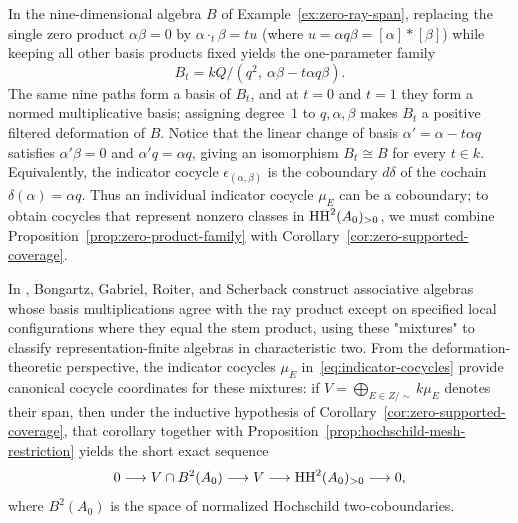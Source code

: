 \begin{example}
\label{ex:zero-product-fibre}
In the nine-dimensional algebra $B$ of Example~\ref{ex:zero-ray-span}, replacing the single zero product $\alpha\beta=0$ by $\alpha\mathbin{\cdot_t}\beta=tu$ (where $u=\alpha q\beta=[\alpha]*[\beta]$) while keeping all other basis products fixed yields the one-parameter family
\[
  B_t=kQ/(q^2,\ \alpha\beta-t\alpha q\beta).
\]
The same nine paths form a basis of $B_t$, and at $t=0$ and $t=1$ they form a normed multiplicative basis; assigning degree~$1$ to $q,\alpha,\beta$ makes $B_t$ a positive filtered deformation of $B$. Notice that the linear change of basis $\alpha'=\alpha-t\alpha q$ satisfies $\alpha'\beta=0$ and $\alpha'q=\alpha q$, giving an isomorphism $B_t\cong B$ for every $t\in k$. Equivalently, the indicator cocycle $\epsilon_{(\alpha,\beta)}$ is the coboundary $d\delta$ of the cochain $\delta(\alpha)=\alpha q$. Thus an individual indicator cocycle $\mu_E$ can be a coboundary; to obtain cocycles that represent nonzero classes in $\operatorname{HH}^2(A_0)_{>0}$, we must combine Proposition~\ref{prop:zero-product-family} with Corollary~\ref{cor:zero-supported-coverage}.
\end{example}

\begin{remark}
\label{rem:classical-mixtures}
In \cite[Sections~9.2--9.7]{BGRS}, Bongartz, Gabriel, Roiter, and Scherback construct associative algebras whose basis multiplications agree with the ray product except on specified local configurations where they equal the stem product, using these "mixtures" to classify representation-finite algebras in characteristic two. From the deformation-theoretic perspective, the indicator cocycles $\mu_E$ in~\eqref{eq:indicator-cocycles} provide canonical cocycle coordinates for these mixtures: if $V=\bigoplus_{E\in Z/{\sim}}k\mu_E$ denotes their span, then under the inductive hypothesis of Corollary~\ref{cor:zero-supported-coverage}, that corollary together with Proposition~\ref{prop:hochschild-mesh-restriction} yields the short exact sequence
\[
  0\longrightarrow V\cap B^2(A_0)\longrightarrow V\longrightarrow\operatorname{HH}^2(A_0)_{>0}\longrightarrow0,
\]
where $B^2(A_0)$ is the space of normalized Hochschild two-coboundaries.
\end{remark}
